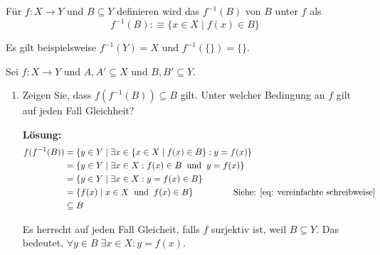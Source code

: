 \begin{mydef} 
  Für $f:X \to Y$ und $B \subseteq Y$ definieren wird das  $f^{-1} (B)$ von $B$ unter $f$ als
  \begin{equation}
    f^{-1} (B) :\equiv \{ x \in X \mid f(x) \in B \}
  \end{equation}

  Es gilt beispielsweise $f^{-1} (Y) = X$ und $f^{-1}( \{\})= \{\}$.
\end{mydef}

\begin{imp-ex}
  Sei $f:X \to Y$ und $A, A' \subseteq X$ und $B,B' \subseteq Y$.
  \begin{enumerate}[label=(\roman*)]
    \item Zeigen Sie, dass $ f(f^{-1}(B)) \subseteq B$ gilt. Unter welcher Bedingung an $f$ gilt auf jeden Fall Gleichheit?

    \textbf{Lösung:}
    \begin{equation}
      \begin{aligned}
        f(f^{-1}(B))
        &= \{ y \in Y \mid \exists x \in \{ x \in X \mid f(x) \in B\} : y= f(x) \} \\
        &= \{ y \in Y \mid \exists x \in X : f(x) \in B \;\; \text{und}\;\; y = f(x) \} \\
        &= \{ y \in Y \mid \exists x \in X : y = f(x) \in B  \} \\
        &= \{ f(x) \mid x \in X \;\; \text{und}\;\; f(x) \in B  \} \qquad \qquad \;\; \text{Siehe: \eqref{eq: vereinfachte schreibweise}}\;\; \\
        & \subseteq B
      \end{aligned}
    \end{equation}

    Es herrscht auf jeden Fall Gleicheit, falls $f$ surjektiv ist, weil $B \subseteq Y$. Das bedeutet, $\forall y \in B \; \exists x \in X: y = f(x)$.
  \end{enumerate}
\end{imp-ex}